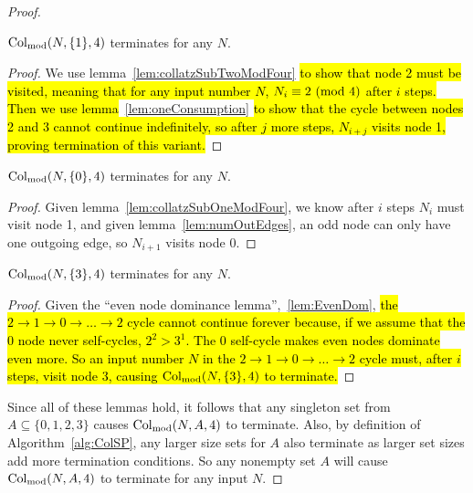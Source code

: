 \begin{proof}
\begin{lemma}
\label{lem:collatzSubOneModFour}
$\mathrm{Col}_{\text{mod}}(N,\{1\},4)$ terminates for any $N$.
\end{lemma}
\begin{proof}
We use lemma~\ref{lem:collatzSubTwoModFour} \hl{to show that node 2 must be visited, meaning that for any input number $N$, $N_i \equiv 2 \ (\mathrm{mod}\ 4)$ after $i$ steps. Then we use lemma}~\ref{lem:oneConsumption} \hl{to show that the cycle between nodes 2 and 3 cannot continue indefinitely, so after $j$ more steps, $N_{i+j}$ visits node 1, proving termination of this variant.}
\end{proof}
\begin{lemma}
\label{lem:collatzSubZeroModFour}
$\mathrm{Col}_{\text{mod}}(N,\{0\},4)$ terminates for any $N$.
\end{lemma}
\begin{proof}
Given lemma~\ref{lem:collatzSubOneModFour}, we know after $i$ steps $N_i$ must visit node 1, and given lemma~\ref{lem:numOutEdges}, an odd node can only have one outgoing edge, so $N_{i+1}$ visits node 0.
\end{proof}
\begin{lemma}
\label{lem:collatzSubThreeModFour}
$\mathrm{Col}_{\text{mod}}(N,\{3\},4)$ terminates for any $N$.
\end{lemma}
\begin{proof}
Given the ``even node dominance lemma'',~\ref{lem:EvenDom}, \hl{the $2 \rightarrow 1 \rightarrow 0 \rightarrow \ldots \rightarrow 2$ cycle cannot continue forever because, if we assume that the 0 node never self-cycles, $2^2 > 3^1$. The 0 self-cycle makes even nodes dominate even more. So an input number $N$ in the $2 \rightarrow 1 \rightarrow 0 \rightarrow \ldots \rightarrow 2$ cycle must, after $i$ steps, visit node 3, causing $\mathrm{Col}_{\text{mod}}(N,\{3\},4)$ to terminate.}
\end{proof}
Since all of these lemmas hold, it follows that any singleton set from $A \subseteq \{0,1,2,3\}$ causes $\mathrm{Col}_{\text{mod}}(N,A,4)$ to terminate. Also, by definition of Algorithm~\ref{alg:ColSP}, any larger size sets for $A$ also terminate as larger set sizes add more termination conditions. So any nonempty set $A$ will cause $\mathrm{Col}_{\text{mod}}(N,A,4)$ to terminate for any input $N$.
\end{proof}
